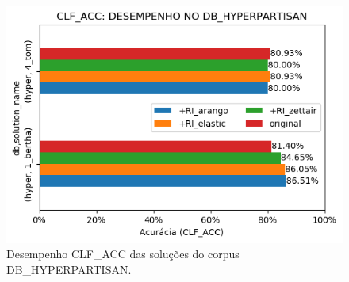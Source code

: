 \begin{figure}[h]
    \centering
    \caption{Desempenho CLF\_ACC das soluções do corpus DB\_HYPERPARTISAN.}
    \vspace{-0.5cm}
    \begin{center}
        \includegraphics[scale=0.75]{img/clf-acc-bars-hyperpartisan.png}
    \end{center}
    \vspace{-0.5cm}
    \label{fig:clf-acc-bars-hyperpartisan}
\end{figure}
